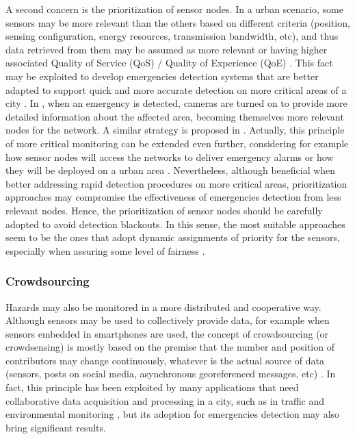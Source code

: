 \begin{refsection}
A second concern is the prioritization of sensor nodes. In a urban scenario, some sensors may be more relevant than the others based on different criteria (position, sensing configuration, energy resources, transmission bandwidth, etc), and thus data retrieved from them may be assumed as more relevant or having higher associated Quality of Service (QoS) / Quality of Experience (QoE) \cite{smartcities3,priority1,qoe1}. This fact may be exploited to develop emergencies detection systems that are better adapted to support quick and more accurate detection on more critical areas of a city \cite{priority4}. In \cite{priority2}, when an emergency is detected, cameras are turned on to provide more detailed information about the affected area, becoming themselves more relevant nodes for the network. A similar strategy is proposed in \cite{priority3}. Actually, this principle of more critical monitoring can be extended even further, considering for example how sensor nodes will access the networks to deliver emergency alarms \cite{qosnetworks1} or how they will be deployed on a urban area \cite{deployment1}. Nevertheless, although beneficial when better addressing rapid detection procedures on more critical areas, prioritization approaches may compromise the effectiveness of emergencies detection from less relevant nodes. Hence, the prioritization of sensor nodes should be carefully adopted to avoid detection blackouts. In this sense, the most suitable approaches seem to be the ones that adopt dynamic assignments of priority for the sensors, especially when assuring some level of fairness \cite{smartcities3}.   

\subsubsection{Crowdsourcing}

Hazards may also be monitored in a more distributed and cooperative way. Although sensors may be used to collectively provide data, for example when sensors embedded in smartphones are used, the concept of crowdsourcing (or crowdsensing) is mostly based on the premise that the number and position of contributors may change continuously, whatever is the actual source of data (sensors, posts on social media, asynchronous georeferenced messages, etc) \cite{crowdsourcing2}. In fact, this principle has been exploited by many applications that need collaborative data acquisition and processing in a city, such as in traffic \cite{citiesvehicles2} and environmental monitoring \cite{bikesensor}, but its adoption for emergencies detection may also bring significant results. 


\end{refsection}
